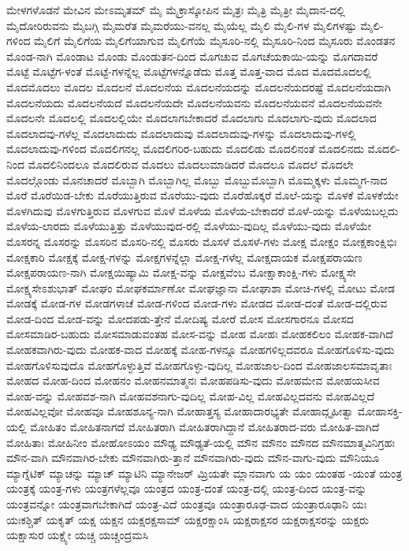 {ಮೇಳಗಳೊಡನೆ
ಮೇವಿನ
ಮೇಽಮೃತಮ್
ಮೈ
ಮೈಕ್ರಾಸ್ಕೋಪಿನ
ಮೈತ್ರಃ
ಮೈತ್ರಿ
ಮೈತ್ರೀ
ಮೈದಾನ-ದಲ್ಲಿ
ಮೈದೋರಿರುವನು
ಮೈಬಗ್ಗಿ
ಮೈಮರೆತ
ಮೈಮರೆಯು-ವನಲ್ಲ
ಮೈಯೆಲ್ಲ
ಮೈಲಿ
ಮೈಲಿ-ಗಳ
ಮೈಲಿಗಳಷ್ಟು
ಮೈಲಿ-ಗಳಿಂದ
ಮೈಲಿಗೆ
ಮೈಲಿಗೆಯ
ಮೈಲಿಗೆಯಾಗುವ
ಮೈಲಿಗೆಯೆ
ಮೈಸೂರಿ-ನಲ್ಲಿ
ಮೈಸೂರಿ-ನಿಂದ
ಮೈಸೂರು
ಮೊಂಡತನ
ಮೊಂಡ-ನಾಗಿ
ಮೊಂಡಾಟ
ಮೊಂಡು
ಮೊಂಡುತನ-ದಿಂದ
ಮೊಗಚುವ
ಮೊಗಚೆಯಕಾಯಿ-ಯನ್ನು
ಮೊಗದಾವರೆ
ಮೊಟ್ಟೆ
ಮೊಟ್ಟೆಗ-ಳಂತೆ
ಮೊಟ್ಟೆ-ಗಳನ್ನೆಲ್ಲ
ಮೊಟ್ಟೆಗಳನ್ನೊಡೆದು
ಮೊತ್ತ
ಮೊತ್ತ-ವಾದ
ಮೊದ
ಮೊದಮೊದಲಲ್ಲಿ
ಮೊದಮೊದಲು
ಮೊದಲ
ಮೊದಲನೆ
ಮೊದಲನೆಯ
ಮೊದಲನೆಯದನ್ನು
ಮೊದಲನೆಯದರಷ್ಟೆ
ಮೊದಲನೆಯದಾಗಿ
ಮೊದಲನೆಯದು
ಮೊದಲನೆಯದೆ
ಮೊದಲನೆಯದೇ
ಮೊದಲನೆಯವನು
ಮೊದಲನೆಯವನೆ
ಮೊದಲನೆಯವನೇ
ಮೊದಲನೇ
ಮೊದಲಲ್ಲಿ
ಮೊದಲಲ್ಲಿಯೇ
ಮೊದಲಾಗಬೇಕಾದರೆ
ಮೊದಲಾಗು
ಮೊದಲಾಗು-ವುದು
ಮೊದಲಾದ
ಮೊದಲಾದವು-ಗಳೆಲ್ಲ
ಮೊದಲಾದುದು
ಮೊದಲಾದುವು
ಮೊದಲಾದುವು-ಗಳನ್ನು
ಮೊದಲಾದುವು-ಗಳಲ್ಲಿ
ಮೊದಲಾದುವು-ಗಳಿಂದ
ಮೊದಲಿಗನಲ್ಲ
ಮೊದಲಿಗರಿರ-ಬಹುದು
ಮೊದಲಿಡು
ಮೊದಲಿನಂತೆ
ಮೊದಲಿನದು
ಮೊದಲಿ-ನಿಂದ
ಮೊದಲಿನಿಂದಲೂ
ಮೊದಲಿರುವ
ಮೊದಲು
ಮೊದಲುಮಾಡಿದರೆ
ಮೊದಲೂ
ಮೊದಲೆ
ಮೊದಲೇ
ಮೊದಲ್ಗೊಂಡು
ಮೊನಚಾದರೆ
ಮೊಬ್ಬಾಗಿ
ಮೊಬ್ಬಾಗಿಲ್ಲ
ಮೊಬ್ಬು
ಮೊಬ್ಬುಮೊಬ್ಬಾಗಿ
ಮೊಮ್ಮಕ್ಕಳು
ಮೊಮ್ಮಗ-ನಾದ
ಮೊರೆ
ಮೊರೆಯಿಡ-ಬೇಕು
ಮೊರೆಯುತ್ತಿರುವ
ಮೊರೆಯು-ವುದು
ಮೊರೆಹೊಕ್ಕರೆ
ಮೊಲೆ-ಯನ್ನು
ಮೊಳಕೆ
ಮೊಳಕೆಯೇ
ಮೊಳಗಿದುವು
ಮೊಳಗುತ್ತಿರುವ
ಮೊಳಗುವ
ಮೊಳೆ
ಮೊಳೆಯ
ಮೊಳೆಯ-ಬೇಕಾದರೆ
ಮೊಳೆ-ಯನ್ನು
ಮೊಳೆಯಬಲ್ಲದು
ಮೊಳೆಯ-ಲಾರದು
ಮೊಳೆಯುತ್ತಿತ್ತು
ಮೊಳೆಯುವುದ-ರಲ್ಲಿ
ಮೊಳೆಯು-ವುದಿಲ್ಲ
ಮೊಳೆಯು-ವುದು
ಮೊಳೆಯೇ
ಮೊಸರನ್ನ
ಮೊಸರನ್ನು
ಮೊಸರಿನ
ಮೊಸರಿ-ನಲ್ಲಿ
ಮೊಸರು
ಮೊಸಳೆ
ಮೊಸಳೆ-ಗಳು
ಮೋಕ್ಷ
ಮೋಕ್ಷಂ
ಮೋಕ್ಷಕಾಂಕ್ಷಿಭಿಃ
ಮೋಕ್ಷಕಾರಿ
ಮೋಕ್ಷಕ್ಕೆ
ಮೋಕ್ಷ-ಗಳನ್ನು
ಮೋಕ್ಷಗಳನ್ನೆಲ್ಲಾ
ಮೋಕ್ಷ-ಗಳೆಲ್ಲ
ಮೋಕ್ಷದಾಯಕ
ಮೋಕ್ಷಪರಾಯಣ
ಮೋಕ್ಷಪರಾಯಣ-ನಾಗಿ
ಮೋಕ್ಷಯಿಷ್ಯಾಮಿ
ಮೋಕ್ಷ-ವನ್ನು
ಮೋಕ್ಷವೆಂಬ
ಮೋಕ್ಷಾಕಾಂಕ್ಷಿ-ಗಳು
ಮೋಕ್ಷ್ಯಸೇ
ಮೋಕ್ಷ್ಯಸೇಽಶುಭಾತ್
ಮೋಘಂ
ಮೋಘಕರ್ಮಾಣೋ
ಮೋಘಜ್ಞಾನಾ
ಮೋಘಾಶಾ
ಮೋಚಿ-ಗಳಲ್ಲಿ
ಮೋಟು
ಮೋಡ
ಮೋಡಕ್ಕೆ
ಮೋಡ-ಗಳ
ಮೋಡಗಳಾಚೆ
ಮೋಡ-ಗಳಿಂದ
ಮೋಡ-ಗಳು
ಮೋಡದ
ಮೋಡ-ದಂತೆ
ಮೋಡ-ದಲ್ಲಿರುವ
ಮೋಡ-ದಿಂದ
ಮೋಡ-ವನ್ನು
ಮೋದಪಡು-ತ್ತೇನೆ
ಮೋದಿಷ್ಯ
ಮೋರೆ
ಮೋಸ
ಮೋಸಗಾರನೂ
ಮೋಸದ
ಮೋಸಮಾಡಿರ-ಬಹುದು
ಮೋಸಮಾಡುವಂತಹ
ಮೋಸ-ವನ್ನು
ಮೋಹ
ಮೋಹಃ
ಮೋಹಕಲಿಲಂ
ಮೋಹಕ-ವಾಗಿದೆ
ಮೋಹಕವಾಗಿರು-ವುದು
ಮೋಹಕ-ವಾದ
ಮೋಹಕ್ಕೆ
ಮೋಹ-ಗಳನ್ನೂ
ಮೋಹಗಳಿಲ್ಲದವರೂ
ಮೋಹಗೊಳಿಸು-ವುದು
ಮೋಹಗೊಳಿಸುವುದೊ
ಮೋಹಗೊಳ್ಳುತ್ತಿವೆ
ಮೋಹಗೊಳ್ಳು-ವುದಿಲ್ಲ
ಮೋಹಜಾಲ-ದಿಂದ
ಮೋಹಜಾಲಸಮಾವೃತಾಃ
ಮೋಹದ
ಮೋಹ-ದಿಂದ
ಮೋಹನಂ
ಮೋಹನಮಾತ್ಮನಃ
ಮೋಹಪಡಿಸು-ವುದು
ಮೋಹಮೇವ
ಮೋಹಯಸೀವ
ಮೋಹ-ವನ್ನು
ಮೋಹವಶ-ನಾಗಿ
ಮೋಹವಶನಾಗು-ವುದಿಲ್ಲ
ಮೋಹ-ವಿಲ್ಲ
ಮೋಹವಿಲ್ಲದವನು
ಮೋಹವಿಲ್ಲದೆ
ಮೋಹವಿಲ್ಲವೋ
ಮೋಹವೂ
ಮೋಹಶೂನ್ಯ-ನಾಗಿ
ಮೋಹಾತ್ತಸ್ಯ
ಮೋಹಾದಾರಭ್ಯತೇ
ಮೋಹಾದ್ಗೃಹೀತ್ವಾ
ಮೋಹಾಸಕ್ತಿ-ಯಲ್ಲಿ
ಮೋಹಿತಂ
ಮೋಹಿತನಾಗದೆ
ಮೋಹಿತರಾಗಿ
ಮೋಹಿತರಾಗಿದ್ದಾನೆ
ಮೋಹಿತರಾದ-ವರು
ಮೋಹಿತ-ವಾಗಿದೆ
ಮೋಹಿತಾಃ
ಮೋಹಿನೀಂ
ಮೋಹೋಽಯಂ
ಮೌಢ್ಯ
ಮೌಢ್ಯತೆ-ಯಲ್ಲಿ
ಮೌನ
ಮೌನಂ
ಮೌನದ
ಮೌನಮಾತ್ಮವಿನಿಗ್ರಹಃ
ಮೌನ-ವಾಗಿ
ಮೌನವಾಗಿರ-ಬೇಕು
ಮೌನವಾಗಿರು-ತ್ತಾನೆ
ಮೌನವಾಗಿರು-ವುದು
ಮೌನ-ವಾಗು-ವುದು
ಮೌನಿಯೂ
ಮ್ಯಾಗ್ನೆಟಿಕ್
ಮ್ಯಾಚನ್ನು
ಮ್ಯಾಚ್
ಮ್ಯಾಟಿನಿ
ಮ್ಯಾನೇಜರ್
ಮ್ರಿಯತೇ
ಮ್ಲಾನವಾಗು
ಯ
ಯಂ
ಯಂತಹ
-ಯಂತೆ
ಯಂತ್ರ
ಯಂತ್ರಕ್ಕೆ
ಯಂತ್ರ-ಗಳು
ಯಂತ್ರಗಳೆಲ್ಲವೂ
ಯಂತ್ರದ
ಯಂತ್ರ-ದಂತೆ
ಯಂತ್ರ-ದಲ್ಲಿ
ಯಂತ್ರ-ದಿಂದ
ಯಂತ್ರ-ವನ್ನು
ಯಂತ್ರವನ್ನೋ
ಯಂತ್ರವಾಗಬೇಕಾಗಿದೆ
ಯಂತ್ರ-ವಿದೆ
ಯಂತ್ರವೂ
ಯಂತ್ರಾರೂಢ-ವಾದ
ಯಂತ್ರಾರೂಢಾನಿ
ಯಃ
ಯಃಕಶ್ಚಿತ್
ಯಕೃತ್
ಯಕ್ಷ
ಯಕ್ಷನ
ಯಕ್ಷರಕ್ಷಸಾಮ್
ಯಕ್ಷರಕ್ಷಾಂಸಿ
ಯಕ್ಷರಾಕ್ಷಸರ
ಯಕ್ಷರಾಕ್ಷಸರನ್ನು
ಯಕ್ಷರು
ಯಕ್ಷಾಸುರ
ಯಕ್ಷ್ಯೇ
ಯಚ್ಚ
ಯಚ್ಚಂದ್ರಮಸಿ
}
